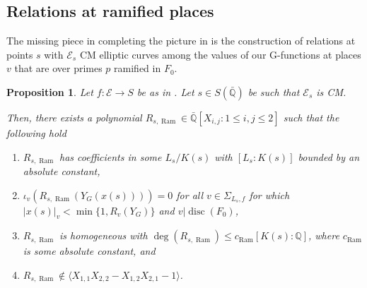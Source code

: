 \documentclass[12pt,twoside,a4paper]{article}
\theoremstyle{plain}%
\newtheorem{prop}[theorem]{Proposition}
\DeclareMathOperator{\ram}{Ram}
\DeclareMathOperator{\disc}{disc}
\newcommand{\Q}{\mathbb{Q}}
\newcommand{\CE}{\mathcal{E}}
\begin{document}
\subsection{Relations at ramified places}\label{section:ramifiedprimescm}

The missing piece in completing the picture in  is the construction of relations at points $s$ with $\CE_s$ CM elliptic curves among the values of our G-functions at places $v$ that are over primes $p$ ramified in $F_0$. 

\begin{prop}\label{propramifiedcm}
	Let $f:\CE\rightarrow S$ be as in . Let $s\in S(\bar{\Q})$ be such that $\CE_s$ is CM.
	
	Then, there exists a polynomial  $R_{s,\ram}\in \bar{\Q}[X_{i,j}:1\leq i,j\leq 2]$ such that the following hold
	\begin{enumerate}
		\item $R_{s,\ram}$ has coefficients in some $L_s/K(s)$ with $[L_s:K(s)]$ bounded by an absolute constant,
		
		\item $\iota_v(R_{s,\ram}(Y_G(x(s))))=0$ for all $v\in\Sigma_{L_s,f}$ for which $|x(s)|_v<\min\{1,R_v(Y_G)\}$ and $v|\disc(F_0)$,
		
		\item $R_{s,\ram}$ is homogeneous with $\deg(R_{s,\ram})\leq c_{\ram}[K(s):\Q]$, where $c_{\ram}$ is some absolute constant, and 
		
		\item $R_{s,\ram}\notin \langle X_{1,1}X_{2,2}-X_{1,2}X_{2,1}-1 \rangle $.
\end{enumerate}\end{prop}
\end{document}
